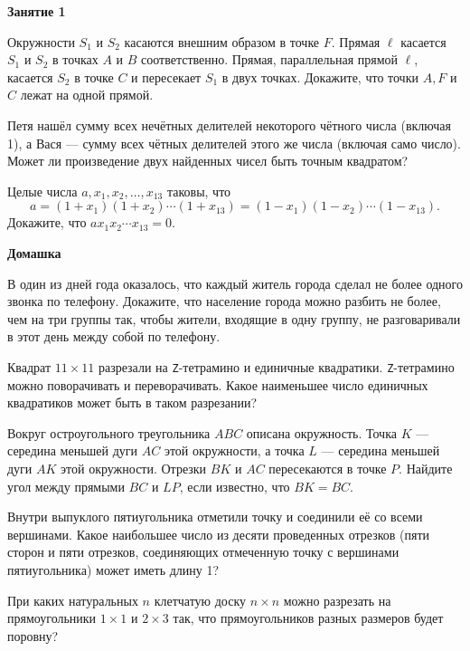 \documentclass{article}
\begin{document}
    \large

    \begin{center}
        \textbf{Занятие 1}
    \end{center}


    \begin{enumerate_boxed}


        \item Окружности $S_1$ и $S_2$ касаются внешним образом в точке $F$.
        Прямая $\ell$ касается $S_1$ и $S_2$ в точках $A$ и $B$ соответственно.
        Прямая, параллельная прямой $\ell$, касается $S_2$ в точке $C$ и пересекает $S_1$ в двух точках.
        Докажите, что точки $A, F$ и $C$ лежат на одной прямой.

        \item Петя нашёл сумму всех нечётных делителей некоторого чётного числа (включая 1), а Вася --- сумму всех чётных делителей этого же числа (включая само число).
        Может ли произведение двух найденных чисел быть точным квадратом?

        \item Целые числа $a,x_1,x_2,\dotsc, x_{13}$ таковы, что
        \[a = (1 + x_1) (1 + x_2) \cdots (1 + x_{13}) = (1 - x_1) (1 - x_2) \cdots (1 - x_{13}). \]
        Докажите, что $ax_{1}x_2 \cdots x_{13} = 0.$

        \begin{center}
            \textbf{Домашка}
        \end{center}

        \item В один из дней года оказалось, что каждый житель города сделал не более одного звонка по телефону.
        Докажите, что население города можно разбить не более, чем на три группы так, чтобы жители, входящие в одну группу, не разговаривали в этот день между собой по телефону.


        \item Квадрат $11 \times 11$ разрезали на \texttt{Z}-тетрамино и единичные квадратики. \texttt{Z}-тетрамино можно поворачивать и переворачивать.
        Какое наименьшее число единичных квадратиков может быть в таком разрезании?

        \item Вокруг остроугольного треугольника $ABC$ описана окружность.
        Точка $K$ — середина меньшей дуги $AC$ этой окружности, а точка $L$ — середина меньшей дуги $AK$ этой окружности.
        Отрезки $BK$ и $AC$ пересекаются в точке $P$.
        Найдите угол между прямыми $BC$ и $LP$, если известно, что $BK = BC$.


        \item Внутри выпуклого пятиугольника отметили точку и соединили её со всеми вершинами.
        Какое наибольшее число из десяти проведенных отрезков (пяти сторон и пяти отрезков, соединяющих отмеченную точку с вершинами пятиугольника) может иметь длину 1?

        \item При каких натуральных $n$ клетчатую доску $n \times n$ можно разрезать на прямоугольники $1 \times 1$ и $2 \times 3$ так, что прямоугольников разных размеров будет поровну?

    \end{enumerate_boxed}
\end{document}
